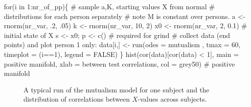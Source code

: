 \documentclass[
  a4paper,
  DIV=11,
  numbers=noendperiod,
  oneside]{scrreprt}
\newenvironment{Shaded}{}{}
\newcommand{\AttributeTok}[1]{\textcolor[rgb]{0.84,0.23,0.29}{#1}}
\newcommand{\CommentTok}[1]{\textcolor[rgb]{0.42,0.45,0.49}{#1}}
\newcommand{\ConstantTok}[1]{\textcolor[rgb]{0.00,0.36,0.77}{#1}}
\newcommand{\ControlFlowTok}[1]{\textcolor[rgb]{0.84,0.23,0.29}{#1}}
\newcommand{\DecValTok}[1]{\textcolor[rgb]{0.00,0.36,0.77}{#1}}
\newcommand{\FloatTok}[1]{\textcolor[rgb]{0.00,0.36,0.77}{#1}}
\newcommand{\FunctionTok}[1]{\textcolor[rgb]{0.44,0.26,0.76}{#1}}
\newcommand{\NormalTok}[1]{\textcolor[rgb]{0.14,0.16,0.18}{#1}}
\newcommand{\OtherTok}[1]{\textcolor[rgb]{0.44,0.26,0.76}{#1}}
\newcommand{\SpecialCharTok}[1]{\textcolor[rgb]{0.00,0.36,0.77}{#1}}
\newcommand{\StringTok}[1]{\textcolor[rgb]{0.01,0.18,0.38}{#1}}
\begin{document}
\begin{Shaded}
\begin{Highlighting}[]
\ControlFlowTok{for}\NormalTok{(i }\ControlFlowTok{in} \DecValTok{1}\SpecialCharTok{:}\NormalTok{nr\_of\_pp)\{}
  \CommentTok{\# sample a,K, starting values X from normal }
  \CommentTok{\# distributions for each person separately}
  \CommentTok{\# note M is constant over persons.}
\NormalTok{  a }\OtherTok{\textless{}{-}} \FunctionTok{rnorm}\NormalTok{(nr\_var, .}\DecValTok{2}\NormalTok{, .}\DecValTok{05}\NormalTok{) }
\NormalTok{  k }\OtherTok{\textless{}{-}} \FunctionTok{rnorm}\NormalTok{(nr\_var, }\DecValTok{10}\NormalTok{, }\DecValTok{2}\NormalTok{)}
\NormalTok{  x0 }\OtherTok{\textless{}{-}} \FunctionTok{rnorm}\NormalTok{(nr\_var, }\DecValTok{2}\NormalTok{, }\FloatTok{0.1}\NormalTok{) }\CommentTok{\# initial state of X}
\NormalTok{  s  }\OtherTok{\textless{}{-}}\NormalTok{ x0; p }\OtherTok{\textless{}{-}} \FunctionTok{c}\NormalTok{() }\CommentTok{\# required for grind}
  \CommentTok{\# collect data (end points) and plot person 1 only:}
\NormalTok{  data[i,] }\OtherTok{\textless{}{-}} \FunctionTok{run}\NormalTok{(}\AttributeTok{odes =}\NormalTok{ mutualism , }\AttributeTok{tmax =} \DecValTok{60}\NormalTok{, }
      \AttributeTok{timeplot =}\NormalTok{ (i}\SpecialCharTok{==}\DecValTok{1}\NormalTok{), }\AttributeTok{legend =} \ConstantTok{FALSE}\NormalTok{) }
\NormalTok{\}}
\FunctionTok{hist}\NormalTok{(}\FunctionTok{cor}\NormalTok{(data)[}\FunctionTok{cor}\NormalTok{(data) }\SpecialCharTok{\textless{}} \DecValTok{1}\NormalTok{], }\AttributeTok{main =} \StringTok{\textquotesingle{}positive manifold\textquotesingle{}}\NormalTok{,}
     \AttributeTok{xlab =} \StringTok{\textquotesingle{}between test correlations\textquotesingle{}}\NormalTok{,}
     \AttributeTok{col =} \StringTok{\textquotesingle{}grey50\textquotesingle{}}\NormalTok{) }\CommentTok{\# positive manifold}
\end{Highlighting}
\end{Shaded}

\begin{figure}


\caption{\label{fig-ch6-img7-old-76}A typical run of the mutualism model
for one subject and the distribution of correlations between
\(X\)-values across subjects.}

\end{figure}%
\end{document}
